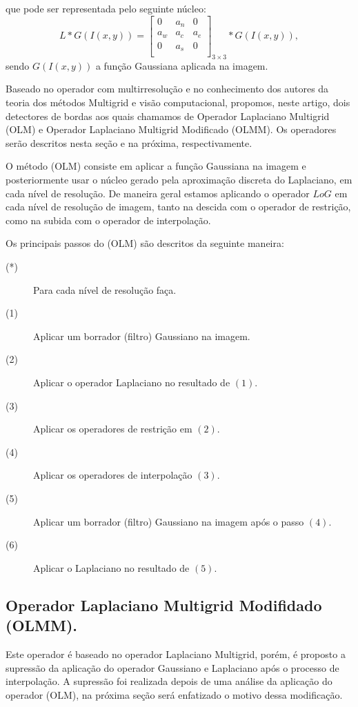 \documentclass[a4paper]{article} %
\begin{document}
que pode ser representada pelo seguinte núcleo:
$$L* G(I(x,y))=\left[
\begin{array}{lrl}
 0 &  a_n & 0\\
 a_w &  a_c & a_e\\
 0 &  a_s & 0\\
\end{array}
\right]_{3 \times 3}* G(I(x,y)),$$
sendo $G(I(x,y))$ a função Gaussiana aplicada na imagem.

Baseado no operador com multirresolução e no conhecimento dos autores da teoria dos métodos Multigrid e visão computacional, propomos, neste artigo, dois detectores de bordas aos quais chamamos de Operador Laplaciano Multigrid (OLM) e Operador Laplaciano Multigrid Modificado (OLMM). Os operadores serão descritos nesta seção e na próxima, respectivamente. 

O método (OLM) consiste em aplicar a função Gaussiana na imagem e posteriormente usar o núcleo gerado pela aproximação discreta do Laplaciano, em cada nível de resolução. De maneira geral estamos aplicando o operador $LoG$ em cada nível de resolução de imagem, tanto na descida com o operador de restrição, como na subida com o operador de interpolação. 

Os principais passos do (OLM) são descritos da seguinte maneira:
\begin{description}
\item[(*)] Para cada nível de resolução faça.
\item[(1)] Aplicar um borrador (filtro) Gaussiano na imagem.
\item[(2)] Aplicar o operador Laplaciano  no resultado de $(1)$.
\item[(3)] Aplicar os operadores de restrição em $(2)$.
\item[(4)] Aplicar os operadores de interpolação $(3)$.
\item[(5)] Aplicar um borrador (filtro) Gaussiano na imagem após o passo $(4)$.
\item[(6)] Aplicar o Laplaciano  no resultado de $(5)$.
\end{description}

\subsection{Operador Laplaciano Multigrid Modifidado (OLMM).}

Este operador é baseado no operador Laplaciano Multigrid, porém, é proposto a supressão da aplicação do operador Gaussiano e Laplaciano após o processo de interpolação. A supressão foi realizada depois de uma análise da aplicação do operador (OLM), na próxima seção será enfatizado o motivo dessa modificação. 
\end{document}
